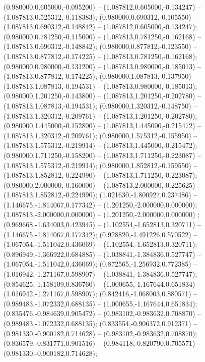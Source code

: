  (0.980000,0.605000,-0.095200) -- (1.087812,0.605000,-0.134247) -- (1.087813,0.525312,-0.118383);
 (0.980000,0.690312,-0.105550) -- (1.087813,0.690312,-0.148842) -- (1.087812,0.605000,-0.134247);
 (0.980000,0.781250,-0.115000) -- (1.087813,0.781250,-0.162168) -- (1.087813,0.690312,-0.148842);
 (0.980000,0.877812,-0.123550) -- (1.087813,0.877812,-0.174225) -- (1.087813,0.781250,-0.162168);
 (0.980000,0.980000,-0.131200) -- (1.087813,0.980000,-0.185013) -- (1.087813,0.877812,-0.174225);
 (0.980000,1.087813,-0.137950) -- (1.087813,1.087813,-0.194531) -- (1.087813,0.980000,-0.185013);
 (0.980000,1.201250,-0.143800) -- (1.087813,1.201250,-0.202780) -- (1.087813,1.087813,-0.194531);
 (0.980000,1.320312,-0.148750) -- (1.087813,1.320312,-0.209761) -- (1.087813,1.201250,-0.202780);
 (0.980000,1.445000,-0.152800) -- (1.087813,1.445000,-0.215472) -- (1.087813,1.320312,-0.209761);
 (0.980000,1.575312,-0.155950) -- (1.087813,1.575312,-0.219914) -- (1.087813,1.445000,-0.215472);
 (0.980000,1.711250,-0.158200) -- (1.087813,1.711250,-0.223087) -- (1.087813,1.575312,-0.219914);
 (0.980000,1.852812,-0.159550) -- (1.087813,1.852812,-0.224990) -- (1.087813,1.711250,-0.223087);
 (0.980000,2.000000,-0.160000) -- (1.087813,2.000000,-0.225625) -- (1.087813,1.852812,-0.224990);
 (1.021630,-1.800927,0.237486) -- (1.146675,-1.814067,0.177342) -- (1.201250,-2.000000,0.000000);
 (1.087813,-2.000000,0.000000) -- (1.201250,-2.000000,0.000000) ;
 (0.969668,-1.634003,0.423945) -- (1.102554,-1.652813,0.320711) -- (1.146675,-1.814067,0.177342);
 (0.928820,-1.491226,0.570522) -- (1.067054,-1.511042,0.436069) -- (1.102554,-1.652813,0.320711);
 (0.896949,-1.366922,0.684885) -- (1.038841,-1.384836,0.527747) -- (1.067054,-1.511042,0.436069);
 (0.872565,-1.256932,0.772385) -- (1.016942,-1.271167,0.598907) -- (1.038841,-1.384836,0.527747);
 (0.854625,-1.158109,0.836760) -- (1.000655,-1.167644,0.651834) -- (1.016942,-1.271167,0.598907);
 (0.842416,-1.068003,0.880571) -- (0.989483,-1.072332,0.688135) -- (1.000655,-1.167644,0.651834);
 (0.835476,-0.984639,0.905472) -- (0.983102,-0.983632,0.708870) -- (0.989483,-1.072332,0.688135);
 (0.833554,-0.906372,0.912371) -- (0.981330,-0.900182,0.714628) -- (0.983102,-0.983632,0.708870);
 (0.836579,-0.831771,0.901516) -- (0.984118,-0.820790,0.705571) -- (0.981330,-0.900182,0.714628);
